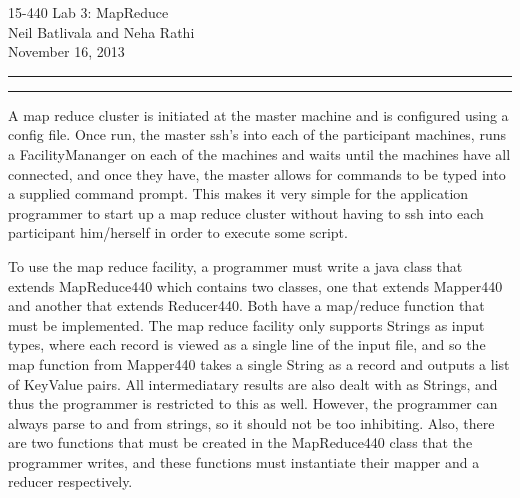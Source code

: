 \documentclass[11pt]{article}
\newcommand{\question}[2] {\vspace{.25in} \hrule\vspace{0.5em}
\noindent{\bf #1: #2} \vspace{0.5em}
\hrule \vspace{.10in}}
\begin{document}
\medskip

\thispagestyle{plain}
\begin{center}
{\Large 15-440 Lab 3: MapReduce} \\
Neil Batlivala and Neha Rathi \\
November 16, 2013 \\
\end{center}

\question{I} {Design}
A map reduce cluster is initiated at the master machine and is configured using a config file. Once run, the master ssh's into each of the participant machines, runs a FacilityMananger on each of the machines and waits until the machines have all connected, and once they have, the master allows for commands to be typed into a supplied command prompt. This makes it very simple for the application programmer to start up a map reduce cluster without having to ssh into each participant him/herself in order to execute some script.

To use the map reduce facility, a programmer must write a java class that extends MapReduce440 which contains two classes, one that extends Mapper440 and another that extends Reducer440. Both have a map/reduce function that must be implemented. The map reduce facility only supports Strings as input types, where each record is viewed as a single line of the input file, and so the map function from Mapper440 takes a single String as a record and outputs a list of KeyValue pairs. All intermediatary results are also dealt with as Strings, and thus the programmer is restricted to this as well. However, the programmer can always parse to and from strings, so it should not be too inhibiting. Also, there are two functions that must be created in the MapReduce440 class that the programmer writes, and these functions must instantiate their mapper and a reducer respectively.
\end{document}
